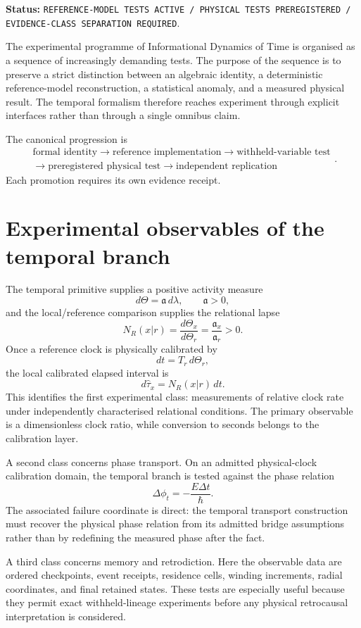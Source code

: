 \noindent\textbf{Status:} \texttt{REFERENCE-MODEL TESTS ACTIVE / PHYSICAL TESTS PREREGISTERED / EVIDENCE-CLASS SEPARATION REQUIRED}.

The experimental programme of Informational Dynamics of Time is organised as a sequence of increasingly demanding tests. The purpose of the sequence is to preserve a strict distinction between an algebraic identity, a deterministic reference-model reconstruction, a statistical anomaly, and a measured physical result. The temporal formalism therefore reaches experiment through explicit interfaces rather than through a single omnibus claim.

The canonical progression is
\[
\boxed{
\begin{gathered}
\text{formal identity}
\longrightarrow
\text{reference implementation}
\longrightarrow
\text{withheld-variable test}
\\
{}\longrightarrow
\text{preregistered physical test}
\longrightarrow
\text{independent replication}
\end{gathered}
}.
\]
Each promotion requires its own evidence receipt.

\section{Experimental observables of the temporal branch}

The temporal primitive supplies a positive activity measure
\[
d\Theta=\mathfrak a\,d\lambda,
\qquad \mathfrak a>0,
\]
and the local/reference comparison supplies the relational lapse
\[
N_R(x|r)=\frac{d\Theta_x}{d\Theta_r}
=\frac{\mathfrak a_x}{\mathfrak a_r}>0.
\]
Once a reference clock is physically calibrated by
\[
dt=T_r\,d\Theta_r,
\]
the local calibrated elapsed interval is
\[
d\widehat\tau_x=N_R(x|r)\,dt.
\]
This identifies the first experimental class: measurements of relative clock rate under independently characterised relational conditions. The primary observable is a dimensionless clock ratio, while conversion to seconds belongs to the calibration layer.

A second class concerns phase transport. On an admitted physical-clock calibration domain, the temporal branch is tested against the phase relation
\[
\Delta\phi_t=-\frac{E\Delta t}{\hbar}.
\]
The associated failure coordinate is direct: the temporal transport construction must recover the physical phase relation from its admitted bridge assumptions rather than by redefining the measured phase after the fact.

A third class concerns memory and retrodiction. Here the observable data are ordered checkpoints, event receipts, residence cells, winding increments, radial coordinates, and final retained states. These tests are especially useful because they permit exact withheld-lineage experiments before any physical retrocausal interpretation is considered.

